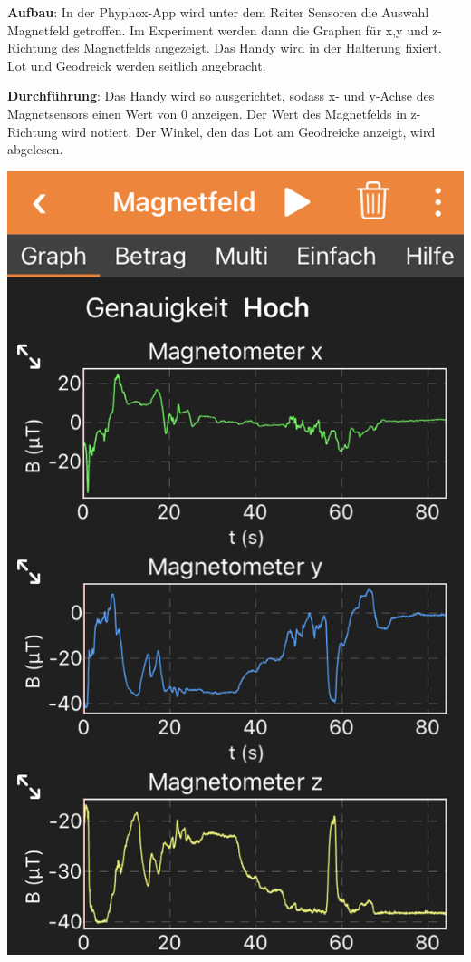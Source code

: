 \documentclass[../main.tex]{subfiles}
\begin{document}
\begin{tcolorbox}
    \vspace{0.2cm}
    \begin{minipage}[]{0.75\textwidth}
        \textbf{Aufbau}: In der Phyphox-App wird unter dem Reiter \glqq Sensoren\grqq{} die Auswahl \glqq Magnetfeld\grqq{} getroffen. Im Experiment werden dann die Graphen für x,y und z-Richtung des Magnetfelds angezeigt. Das Handy wird in der Halterung fixiert. Lot und Geodreick werden seitlich angebracht.  

        \vspace{0.5cm}
        \textbf{Durchführung}: Das Handy wird so ausgerichtet, sodass x- und y-Achse des Magnetsensors einen Wert von $0$ anzeigen. Der Wert des Magnetfelds in z-Richtung wird notiert. Der Winkel, den das Lot am Geodreicke anzeigt, wird abgelesen.  
    \end{minipage}
    \hspace{0.3cm}
    \begin{minipage}[]{0.2\textwidth}
        \includegraphics[width=\textwidth]{img/app}
    \end{minipage}


\end{tcolorbox}
\end{document}
